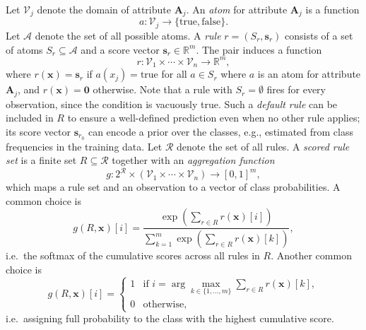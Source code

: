\documentclass[a4paper,twoside]{article}
\begin{document}
Let $\mathcal{V}_j$ denote the domain of attribute $\mathbf{A}_j$. An \emph{atom} for attribute $\mathbf{A}_j$ is a function
\begin{equation*}
  a: \mathcal{V}_j \rightarrow \{\text{true}, \text{false}\}.
\end{equation*}
Let $\mathcal{A}$ denote the set of all possible atoms. A \emph{rule} $r = (S_r, \mathbf{s}_r)$ consists of a set of atoms $S_r \subseteq \mathcal{A}$ and a score vector $\mathbf{s}_r \in \mathbb{R}^m$. The pair induces a function
\begin{equation*}
  r: \mathcal{V}_1 \times \cdots \times \mathcal{V}_n \rightarrow \mathbb{R}^m,
\end{equation*}
where $r(\mathbf{x}) = \mathbf{s}_r$ if $a(x_j) = \text{true}$ for all $a \in S_r$ where $a$ is an atom for attribute $\mathbf{A}_j$, and $r(\mathbf{x}) = \mathbf{0}$ otherwise. Note that a rule with $S_r = \emptyset$ fires for every observation, since the condition is vacuously true. Such a \emph{default rule} can be included in $R$ to ensure a well-defined prediction even when no other rule applies; its score vector $\mathbf{s}_{r_0}$ can encode a prior over the classes, e.g., estimated from class frequencies in the training data.
Let $\mathcal{R}$ denote the set of all rules. A \emph{scored rule set} is a finite set $R \subseteq \mathcal{R}$ together with an \emph{aggregation function}
\begin{equation*}
  g: 2^{\mathcal{R}} \times (\mathcal{V}_1 \times \cdots \times \mathcal{V}_n) \rightarrow [0,1]^m,
\end{equation*}
which maps a rule set and an observation to a vector of class probabilities. A common choice is
\begin{equation*}
  g(R, \mathbf{x})[i] = \frac{\exp\!\left(\sum_{r \in R} r(\mathbf{x})[i]\right)}{\sum_{k=1}^{m} \exp\!\left(\sum_{r \in R} r(\mathbf{x})[k]\right)},
\end{equation*}
i.e.\ the softmax of the cumulative scores across all rules in $R$. Another common choice is
\begin{equation*}
  g(R, \mathbf{x})[i] = \begin{cases} 1 & \text{if } i = \arg\max_{k \in \{1,\ldots,m\}} \sum_{r \in R} r(\mathbf{x})[k], \\ 0 & \text{otherwise,} \end{cases}
\end{equation*}
i.e.\ assigning full probability to the class with the highest cumulative score.
\end{document}

